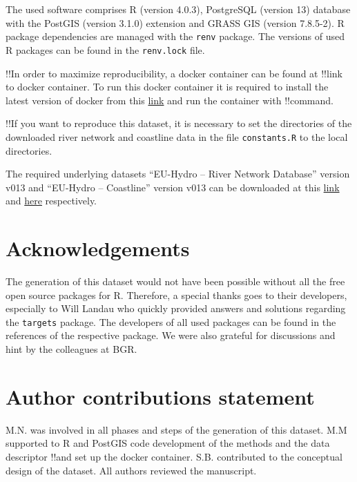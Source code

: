 \documentclass[fleqn,10pt]{wlscirep}
\begin{document}
The used software comprises R (version 4.0.3), PostgreSQL (version 13) database with the PostGIS (version 3.1.0) extension and GRASS GIS (version 7.8.5-2). R package dependencies are managed with the \texttt{renv} package. The versions of used R packages can be found in the \texttt{renv.lock} file.

!!In order to maximize reproducibility, a docker container can be found at !!link to docker container. To run this docker container it is required to install the latest version of docker from this \href{https://www.docker.com/products/docker-desktop}{link} and run the container with !!command.

!!If you want to reproduce this dataset, it is necessary to set the directories of the downloaded river network and coastline data in the file \texttt{constants.R} to the local directories.

The required underlying datasets ``EU-Hydro -- River Network Database'' version v013 and ``EU-Hydro -- Coastline'' version v013 can be downloaded at this \href{https://land.copernicus.eu/imagery-in-situ/eu-hydro/eu-hydro-river-network-database?tab=download}{link} and \href{https://land.copernicus.eu/imagery-in-situ/eu-hydro/eu-hydro-coastline?tab=download}{here} respectively.

\hypertarget{acknowledgements}{%
\section*{Acknowledgements}\label{acknowledgements}}

The generation of this dataset would not have been possible without all the free open source packages for R. Therefore, a special thanks goes to their developers, especially to Will Landau who quickly provided answers and solutions regarding the \texttt{targets} package. The developers of all used packages can be found in the references of the respective package. We were also grateful for discussions and hint by the colleagues at BGR.

\hypertarget{author-contributions-statement}{%
\section*{Author contributions statement}\label{author-contributions-statement}}

M.N. was involved in all phases and steps of the generation of this dataset. M.M supported to R and PostGIS code development of the methods and the data descriptor !!and set up the docker container. S.B. contributed to the conceptual design of the dataset. All authors reviewed the manuscript.
\end{document}
